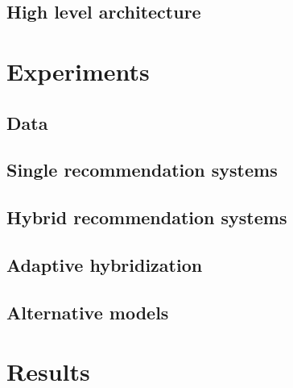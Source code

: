 \documentclass[10pt]{reportMaster}
\begin{document}
\section{High level architecture}








\chapter{Experiments}

\section{Data}

\section{Single recommendation systems}

\section{Hybrid recommendation systems}

\section{Adaptive hybridization}

\section{Alternative models}







\chapter{Results}
\end{document}
